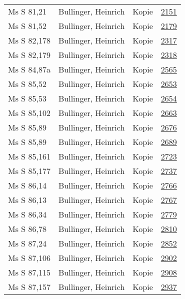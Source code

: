 \documentclass[10pt,a4paper,landscape]{report}
\begin{document}
\begin{longtable}{p{16cm}p{4cm}lr}
Ms S 81,21	&	Bullinger, Heinrich	&	Kopie	&	\href{http://130.60.24.72/assignment/2151}{2151}\\
Ms S 81,52	&	Bullinger, Heinrich	&	Kopie	&	\href{http://130.60.24.72/assignment/2179}{2179}\\
Ms S 82,178	&	Bullinger, Heinrich	&	Kopie	&	\href{http://130.60.24.72/assignment/2317}{2317}\\
Ms S 82,179	&	Bullinger, Heinrich	&	Kopie	&	\href{http://130.60.24.72/assignment/2318}{2318}\\
Ms S 84,87a	&	Bullinger, Heinrich	&	Kopie	&	\href{http://130.60.24.72/assignment/2565}{2565}\\
Ms S 85,52	&	Bullinger, Heinrich	&	Kopie	&	\href{http://130.60.24.72/assignment/2653}{2653}\\
Ms S 85,53	&	Bullinger, Heinrich	&	Kopie	&	\href{http://130.60.24.72/assignment/2654}{2654}\\
Ms S 85,102	&	Bullinger, Heinrich	&	Kopie	&	\href{http://130.60.24.72/assignment/2663}{2663}\\
Ms S 85,89	&	Bullinger, Heinrich	&	Kopie	&	\href{http://130.60.24.72/assignment/2676}{2676}\\
Ms S 85,89	&	Bullinger, Heinrich	&	Kopie	&	\href{http://130.60.24.72/assignment/2689}{2689}\\
Ms S 85,161	&	Bullinger, Heinrich	&	Kopie	&	\href{http://130.60.24.72/assignment/2723}{2723}\\
Ms S 85,177	&	Bullinger, Heinrich	&	Kopie	&	\href{http://130.60.24.72/assignment/2737}{2737}\\
Ms S 86,14	&	Bullinger, Heinrich	&	Kopie	&	\href{http://130.60.24.72/assignment/2766}{2766}\\
Ms S 86,13	&	Bullinger, Heinrich	&	Kopie	&	\href{http://130.60.24.72/assignment/2767}{2767}\\
Ms S 86,34	&	Bullinger, Heinrich	&	Kopie	&	\href{http://130.60.24.72/assignment/2779}{2779}\\
Ms S 86,78	&	Bullinger, Heinrich	&	Kopie	&	\href{http://130.60.24.72/assignment/2810}{2810}\\
Ms S 87,24	&	Bullinger, Heinrich	&	Kopie	&	\href{http://130.60.24.72/assignment/2852}{2852}\\
Ms S 87,106	&	Bullinger, Heinrich	&	Kopie	&	\href{http://130.60.24.72/assignment/2902}{2902}\\
Ms S 87,115	&	Bullinger, Heinrich	&	Kopie	&	\href{http://130.60.24.72/assignment/2908}{2908}\\
Ms S 87,157	&	Bullinger, Heinrich	&	Kopie	&	\href{http://130.60.24.72/assignment/2937}{2937}\\

\end{longtable}
\end{document}
